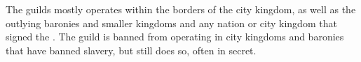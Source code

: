 The guilds mostly operates within the borders of the city kingdom, as well as
the outlying baronies and smaller kingdoms and any nation or city kingdom
that signed the . The guild is banned from operating
in city kingdoms and baronies that have banned slavery, but still does so, often
in secret.
